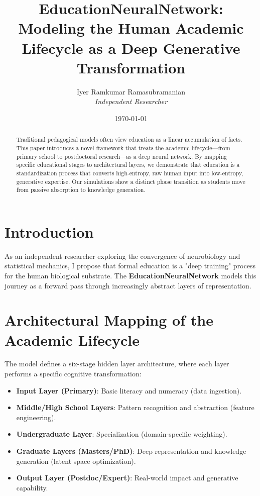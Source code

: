 \documentclass[12pt]{article}
\title{\textbf{EducationNeuralNetwork: \\ Modeling the Human Academic Lifecycle as a Deep Generative Transformation}}
\author{Iyer Ramkumar Ramasubramanian \\ \textit{Independent Researcher}}
\date{\today}
\begin{document}
\maketitle

\begin{abstract}
Traditional pedagogical models often view education as a linear accumulation of facts. This paper introduces a novel framework that treats the academic lifecycle—from primary school to postdoctoral research—as a deep neural network. By mapping specific educational stages to architectural layers, we demonstrate that education is a standardization process that converts high-entropy, raw human input into low-entropy, generative expertise. Our simulations show a distinct phase transition as students move from passive absorption to knowledge generation.
\end{abstract}

\section{Introduction}
As an independent researcher exploring the convergence of neurobiology and statistical mechanics, I propose that formal education is a "deep training" process for the human biological substrate. The \textbf{EducationNeuralNetwork} models this journey as a forward pass through increasingly abstract layers of representation.

\section{Architectural Mapping of the Academic Lifecycle}

The model defines a six-stage hidden layer architecture, where each layer performs a specific cognitive transformation:

\begin{itemize}
\item \textbf{Input Layer (Primary)}: Basic literacy and numeracy (data ingestion).
\item \textbf{Middle/High School Layers}: Pattern recognition and abstraction (feature engineering).
\item \textbf{Undergraduate Layer}: Specialization (domain-specific weighting).
\item \textbf{Graduate Layers (Masters/PhD)}: Deep representation and knowledge generation (latent space optimization).
\item \textbf{Output Layer (Postdoc/Expert)}: Real-world impact and generative capability.
\end{itemize}
\end{document}
